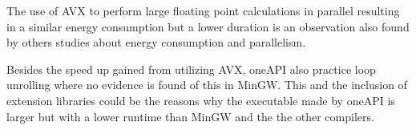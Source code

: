 The use of AVX to perform large floating point calculations in parallel resulting in a similar energy consumption but a lower duration is an observation also found by others studies about energy consumption and parallelism\cite{Lindholt2022}.

Besides the speed up gained from utilizing AVX, oneAPI also practice loop unrolling where no evidence is found of this in MinGW. This and the inclusion of extension libraries could be the reasons why the executable made by oneAPI is larger but with a lower runtime than MinGW and the the other compilers.








